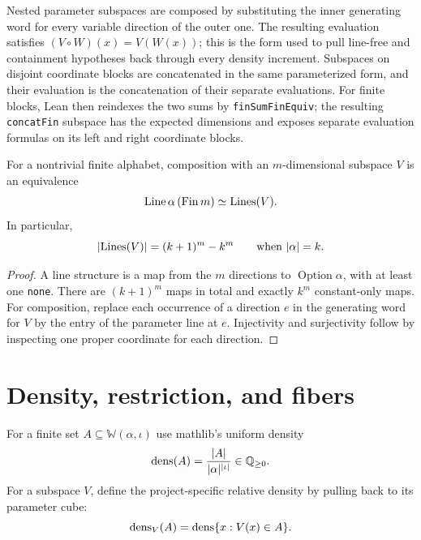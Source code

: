 Nested parameter subspaces are composed by substituting the inner generating word for every
variable direction of the outer one.  The resulting evaluation satisfies
$(V\circ W)(x)=V(W(x))$; this is the form used to pull line-free and containment hypotheses back
through every density increment.
Subspaces on disjoint coordinate blocks are concatenated in the same parameterized form, and their
evaluation is the concatenation of their separate evaluations.
For finite blocks, Lean then reindexes the two sums by \texttt{finSumFinEquiv}; the resulting
\texttt{concatFin} subspace has the expected dimensions and exposes separate evaluation formulas
on its left and right coordinate blocks.

\begin{lemma}
\label{lem:lines-equiv}
For a nontrivial finite alphabet, composition with an $m$-dimensional subspace $V$ is an
equivalence
\[
  \operatorname{Line}\alpha\,(\operatorname{Fin}m)
  \simeq \operatorname{Lines}(V).
\]
In particular,
\[
  \lvert \operatorname{Lines}(V)\rvert=(k+1)^m-k^m
  \qquad\text{when }\lvert \alpha\rvert=k.
\]
\end{lemma}

\begin{proof}
A line structure is a map from the $m$ directions to $\operatorname{Option}\alpha$, with at least
one \texttt{none}.  There are $(k+1)^m$ maps in total and exactly $k^m$ constant-only maps.  For
composition, replace each occurrence of a direction $e$ in the generating word for $V$ by the
entry of the parameter line at $e$.  Injectivity and surjectivity follow by inspecting one proper
coordinate for each direction.
\end{proof}

\section{Density, restriction, and fibers}

\begin{definition}
\label{def:density}
\mathlibok
For a finite set $A\subseteq\mathbb W(\alpha,\iota)$ use mathlib's uniform density
\[
  \operatorname{dens}(A)=\frac{\lvert A\rvert}{\lvert \alpha\rvert^{\lvert \iota\rvert}}\in\mathbb Q_{\geq0}.
\]
For a subspace $V$, define the project-specific relative density by pulling back to its parameter
cube:
\[
  \operatorname{dens}_V(A)=\operatorname{dens}\{x:V(x)\in A\}.
\]
\end{definition}

